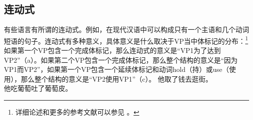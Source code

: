 \begin{exe}
\begin{xlist}[iv.]
\begin{exe}
\begin{xlist}[iv.]
\subsection{连动式}
有些语言有所谓的连动式。例如，在现代汉语中可以构成只有一个主语和几个动词短语的句子\citep[\S~21]{LT81a}。连动式有多种意义，具体意义是什么取决于VP当中体标记的分布：\footnote{%
  详细论述和更多的参考文献可以参见 。
} 
如果第一个VP包含一个完成体标记，那么连动式的意义是“VP1为了达到VP2”（a）。如果第二个VP包含一个完成体标记，那么整个结构的意义是“因为VP1而VP2”，如果第一个VP包含一个延续体标记和动词hold（持）或use（使用），那么整个结构的意义是“VP2使用VP1”（c）。
\eal
\ex
     他取了钱去逛街。 \\

\ex
     他吃葡萄吐了葡萄皮。 \\


\end{xlist}
\end{exe}
\end{xlist}
\end{exe}
